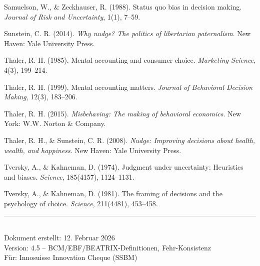 \documentclass[11pt,a4paper]{article}
\begin{document}
\vspace{0.3cm}
Samuelson, W., \& Zeckhauser, R. (1988). Status quo bias in decision making. \textit{Journal of Risk and Uncertainty}, 1(1), 7--59.

\vspace{0.3cm}
Sunstein, C. R. (2014). \textit{Why nudge? The politics of libertarian paternalism}. New Haven: Yale University Press.

\vspace{0.3cm}
Thaler, R. H. (1985). Mental accounting and consumer choice. \textit{Marketing Science}, 4(3), 199--214.

\vspace{0.3cm}
Thaler, R. H. (1999). Mental accounting matters. \textit{Journal of Behavioral Decision Making}, 12(3), 183--206.

\vspace{0.3cm}
Thaler, R. H. (2015). \textit{Misbehaving: The making of behavioral economics}. New York: W.W. Norton \& Company.

\vspace{0.3cm}
Thaler, R. H., \& Sunstein, C. R. (2008). \textit{Nudge: Improving decisions about health, wealth, and happiness}. New Haven: Yale University Press.

\vspace{0.3cm}
Tversky, A., \& Kahneman, D. (1974). Judgment under uncertainty: Heuristics and biases. \textit{Science}, 185(4157), 1124--1131.

\vspace{0.3cm}
Tversky, A., \& Kahneman, D. (1981). The framing of decisions and the psychology of choice. \textit{Science}, 211(4481), 453--458.

\vspace{2cm}

\begin{center}
\rule{0.4\textwidth}{0.5pt}\\[0.5em]
{\small Dokument erstellt: 12. Februar 2026}\\
{\small Version: 4.5 -- BCM/EBF/BEATRIX-Definitionen, Fehr-Konsistenz}\\
{\small Für: Innosuisse Innovation Cheque (SSBM)}
\end{center}
\end{document}
